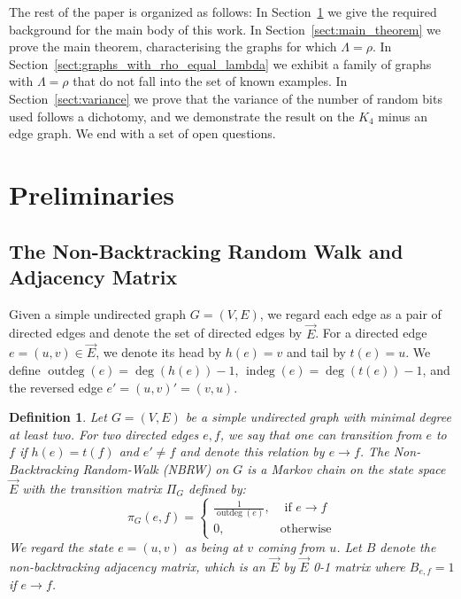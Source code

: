 \documentclass{article}
\newtheorem{definition}[theorem]{Definition}
\newcommand{\dirE}{\vec{E}}
\DeclareMathOperator{\outdeg}{outdeg}
\DeclareMathOperator{\indeg}{indeg}
\begin{document}
    The rest of the paper is organized as follows:
    In Section~\ref{sect:preliminaries} we give the required background for the main body of this work.
    In Section~\ref{sect:main_theorem} we prove the main theorem, characterising the graphs for which $\Lambda = \rho$.
    In Section~\ref{sect:graphs_with_rho_equal_lambda} we exhibit a family of graphs with $\Lambda = \rho$ that do not fall into the set of known examples. 
    In Section~\ref{sect:variance} we prove that the variance of the number of random bits used follows a dichotomy,     and we demonstrate the result on the $K_4$ minus an edge graph.
    We end with a set of open questions.
\section{Preliminaries}\label{sect:preliminaries}
\subsection{The Non-Backtracking Random Walk and Adjacency Matrix}\label{subsection:nbrw}
Given a simple undirected graph $G=(V,E)$, we regard each edge as a pair of directed edges and denote the set of directed edges by $\dirE$.
For a directed edge $e=(u,v) \in \dirE$, we denote its head by $h(e) = v$ and tail by $t(e) = u$.
We define $\outdeg(e) = \deg(h(e))-1$, $\indeg(e) = \deg(t(e))-1$, and the reversed edge $e' = (u,v)' = (v,u)$. 
\begin{definition}
    Let $G=(V,E)$ be a simple undirected graph with minimal degree at least two.  
    For two directed edges $e,f$, we say that one can transition from $e$ to $f$ if $h(e)=t(f)$ and $e' \neq f$ and denote this relation by $e \rightarrow f$.
    The Non-Backtracking Random-Walk (NBRW) on $G$ is a Markov chain on the state space $\dirE$ with the transition matrix $\Pi_G$ defined by:
    \begin{equation*}
        \pi_G(e,f) = \begin{cases}
             \frac{1}{\outdeg(e)}, & \mbox{ if }e \rightarrow f\\
             0,                    & \mbox{otherwise}
        \end{cases}
    \end{equation*}
    We regard the state $e=(u,v)$ as being at $v$ coming from $u$. 
    Let $B$ denote the non-backtracking adjacency matrix, which is an $\dirE$ by $\dirE$ 0-1 matrix where $B_{e,f}=1$ if $e \rightarrow f$.
\end{definition}
\end{document}
